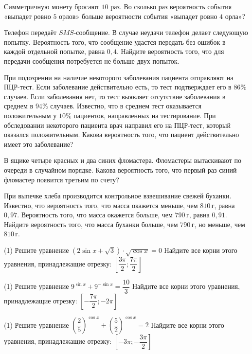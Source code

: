 \begin{homework}[number=3]
\begin{listofex}
		\item Симметричную монету бросают \(10\) раз. Во сколько раз вероятность события «выпадет ровно \(5\) орлов» больше вероятности события «выпадет ровно \(4\) орла»?
		\item Телефон передаёт \(SMS\)-сообщение. В случае неудачи телефон делает следующую попытку. Вероятность того, что сообщение удастся передать без ошибок в каждой отдельной попытке, равна \(0,4\). Найдите вероятность того, что для передачи сообщения потребуется не больше двух попыток.
		\item При подозрении на наличие некоторого заболевания пациента отправляют на ПЦР-тест. Если заболевание действительно есть, то тест подтверждает его в \(86\%\) случаев. Если заболевания нет, то тест выявляет отсутствие заболевания в среднем в \(94\%\) случаев. Известно, что в среднем тест оказывается положительным у \(10\%\) пациентов, направленных на тестирование.
		При обследовании некоторого пациента врач направил его на ПЦР-тест, который оказался положительным. Какова вероятность того, что пациент действительно имеет это заболевание?
		\item В ящике четыре красных и два синих фломастера. Фломастеры вытаскивают по очереди в случайном порядке. Какова вероятность того, что первый раз синий фломастер появится третьим по счету?
		\item При выпечке хлеба производится контрольное взвешивание свежей буханки. Известно, что вероятность того, что масса окажется меньше, чем \(810\) г, равна \(0,97\). Вероятность того, что масса окажется больше, чем \(790\) г, равна \(0,91\). Найдите вероятность того, что масса буханки больше, чем \(790\) г, но меньше, чем \(810\) г.
		\item %
		\begin{tasks}(1)
			\task Решите уравнение \( (2\sin x+\sqrt{3}) \cdot \sqrt{\cos x}=0 \)
			\task Найдите все корни этого уравнения, принадлежащие отрезку: \( \left[ \dfrac{3\pi}{2}; \dfrac{7\pi}{2} \right] \)
		\end{tasks}
		\item %
		\begin{tasks}(1)
			\task Решите уравнение \( 9^{\sin{x}}+9^{-\sin x}=\dfrac{10}{3} \)
			\task Найдите все корни этого уравнения, принадлежащие отрезку: \( \left[ -\dfrac{7\pi}{2}; -2\pi \right]  \)
		\end{tasks}
		\newpage
		\item %
		\begin{tasks}(1)
			\task Решите уравнение \( \left( \dfrac{2}{5} \right)^{\cos x}+ \left( \dfrac{5}{2} \right)^{\cos x}=2 \)
			\task Найдите все корни этого уравнения, принадлежащие отрезку: \( \left[ -3\pi;-\dfrac{3\pi}{2} \right]  \)
		\end{tasks}
	\end{listofex}
\end{homework}

